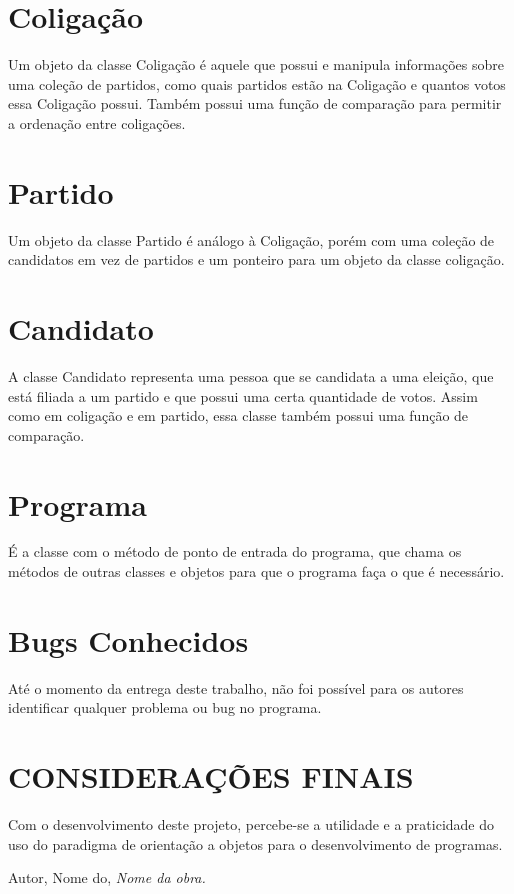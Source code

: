 \documentclass[oneside]{abntex2}
\begin{document}
	\section{Coligação}
Um objeto da classe Coligação é aquele que possui e manipula informações sobre uma coleção de partidos, como quais partidos estão na Coligação e quantos votos essa Coligação possui. Também possui uma função de comparação para permitir a ordenação entre coligações.

	\section{Partido}
Um objeto da classe Partido é análogo à Coligação, porém com uma coleção de candidatos em vez de partidos e um ponteiro para um objeto da classe coligação.

	\section{Candidato}
A classe Candidato representa uma pessoa que se candidata a uma eleição, que está filiada a um partido e que possui uma certa quantidade de votos. Assim como em coligação e em partido, essa classe também possui uma função de comparação.

	\section{Programa}
É a classe com o método de ponto de entrada do programa, que chama os métodos de outras classes e objetos para que o programa faça o que é necessário.

	\section{Bugs Conhecidos}
Até o momento da entrega deste trabalho, não foi possível para os autores identificar qualquer problema ou bug no programa.

    \newpage
    \section{CONSIDERAÇÕES FINAIS}
Com o desenvolvimento deste projeto, percebe-se a utilidade e a praticidade do uso do paradigma de orientação a objetos para o desenvolvimento de programas.


	\begin{thebibliography}{5}
	 Autor, Nome do, \textit{Nome da obra.}
	\end{thebibliography}
\end{document}
